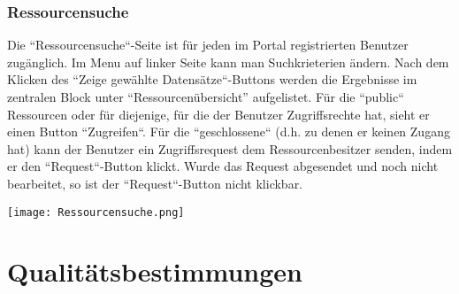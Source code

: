 \documentclass[parskip=full,11pt]{scrartcl}
\begin{document}
\subsubsection*{Ressourcensuche}
Die ``Ressourcensuche``-Seite ist für jeden im Portal registrierten Benutzer zugänglich. Im Menu auf linker Seite kann man Suchkrieterien ändern. Nach dem Klicken des ``Zeige gewählte Datensätze``-Buttons werden die Ergebnisse im zentralen Block unter “Ressourcenübersicht” aufgelistet. Für die ``public`` Ressourcen oder für diejenige, für die der Benutzer Zugriffsrechte hat, sieht er einen Button ``Zugreifen``. Für die ``geschlossene`` (d.h. zu denen er keinen Zugang hat) kann der Benutzer ein Zugriffsrequest dem Ressourcenbesitzer senden, indem er den ``Request``-Button klickt. Wurde das Request abgesendet und noch nicht bearbeitet, so ist der ``Request``-Button nicht klickbar.
	\begin{center}
	\texttt{[image: Ressourcensuche.png]}
	\end{center}
	
	
\section{Qualitätsbestimmungen}
\end{document}
